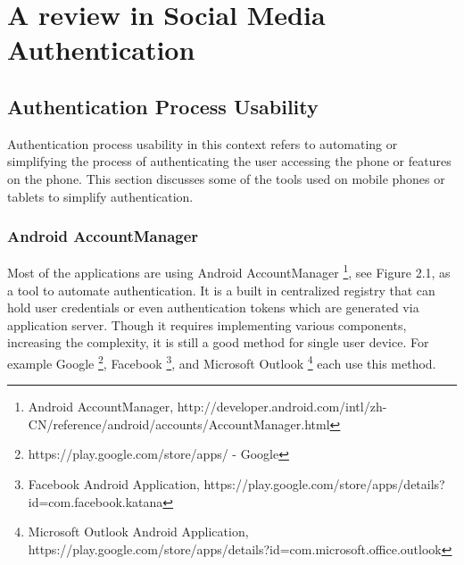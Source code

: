 
\chapter{A review in Social Media Authentication} %




\ifpdf
    \graphicspath{{X/figures/PNG/}{X/figures/PDF/}{X/figures/}}
\else
    \graphicspath{{X/figures/EPS/}{X/figures/}}
\fi



\section{Authentication Process Usability}
Authentication process usability in this context refers to automating or simplifying the process of authenticating the user accessing the phone or features on the phone. This section discusses some of the tools used on mobile phones or tablets to simplify authentication.

\subsection{Android AccountManager}
Most of the applications are using Android AccountManager \footnote[1]{Android AccountManager, http://developer.android.com/intl/zh-CN/reference/android/accounts/AccountManager.html}, see Figure 2.1, as a tool to automate authentication. It is a built in centralized registry that can hold user credentials or even authentication tokens which are generated via application server. Though it requires implementing various components, increasing the complexity, it is still a good method for single user device. For example Google \footnote[2]{https://play.google.com/store/apps/ - Google}, Facebook \footnote[3]{Facebook Android Application, https://play.google.com/store/apps/details?id=com.facebook.katana}, and Microsoft Outlook \footnote[4]{Microsoft Outlook Android Application, https://play.google.com/store/apps/details?id=com.microsoft.office.outlook} each use this method. 


